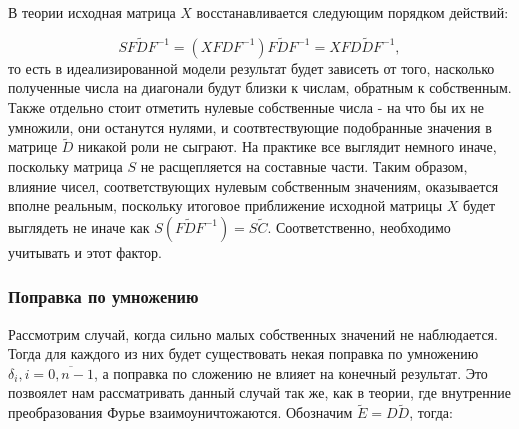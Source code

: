\documentclass[a4paper]{article}
\theoremstyle{definition}
\begin{document}
    В теории исходная матрица $X$ восстанавливается следующим порядком действий:

    $$S  F\tilde{D}F^{-1} = (X FDF^{-1}) F\tilde{D}F^{-1} = X FD\tilde{D}F^{-1},$$ то есть в идеализированной модели результат будет зависеть от того, насколько полученные числа на диагонали будут близки к числам, обратным к собственным. Также отдельно стоит отметить нулевые собственные числа - на что бы их не умножили, они останутся нулями, и соотвтествующие подобранные значения в матрице $\tilde{D}$ никакой роли не сыграют. На практике все выглядит немного иначе, поскольку матрица $S$ не расщепляется на составные части. Таким образом, влияние чисел, соответствующих нулевым собственным значениям, оказывается вполне реальным, поскольку итоговое приближение исходной матрицы $X$ будет выглядеть не иначе как $S (F\tilde{D}F^{-1}) = S\tilde{C}$. Соответственно, необходимо учитывать и этот фактор.


    \subsubsection{Поправка по умножению}


    Рассмотрим случай, когда сильно малых собственных значений не наблюдается. Тогда для каждого из них будет существовать некая поправка по умножению $\delta_i, i = \overline{0, n-1}$, а поправка по сложению не влияет на конечный результат. Это позвоялет нам рассматривать данный случай так же, как в теории, где внутренние преобразования Фурье взаимоуничтожаются. Обозначим $\tilde{E} = D\tilde{D}$, тогда:
\end{document}
